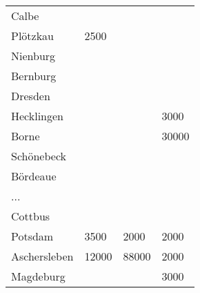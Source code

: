 \begin{center}
    \begin{small}
        \tablehead{}
        \begin{mssql}
            \begin{supertabular}{llll}
                Calbe &  &  &  \\
                Plötzkau & 2500 &  &  \\
                Nienburg &  &  &  \\
                Bernburg &  &  &  \\
                Dresden &  &  &  \\
                Hecklingen &  &  & 3000 \\
                Borne &  &  & 30000 \\
                Schönebeck &  &  &  \\
                Bördeaue &  &  &  \\
                ... & & & \\
                Cottbus &  &  &  \\
                Potsdam & 3500 & 2000 & 2000 \\
                Aschersleben & 12000 & 88000 & 2000 \\
                Magdeburg &  &  & 3000 \\
            \end{supertabular}
        \end{mssql}
    \end{small}
\end{center}